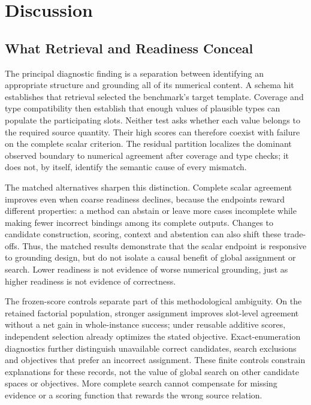 \documentclass[pdflatex,sn-basic,Numbered]{sn-jnl}
\begin{document}
\section{Discussion}
\label{sec:discussion}
\subsection{What Retrieval and Readiness Conceal}
The principal diagnostic finding is a separation between identifying an appropriate structure and grounding all of its numerical content. A schema hit establishes that retrieval selected the benchmark's target template. Coverage and type compatibility then establish that enough values of plausible types can populate the participating slots. Neither test asks whether each value belongs to the required source quantity. Their high scores can therefore coexist with failure on the complete scalar criterion. The residual partition localizes the dominant observed boundary to numerical agreement after coverage and type checks; it does not, by itself, identify the semantic cause of every mismatch.

The matched alternatives sharpen this distinction. Complete scalar agreement improves even when coarse readiness declines, because the endpoints reward different properties: a method can abstain or leave more cases incomplete while making fewer incorrect bindings among its complete outputs. Changes to candidate construction, scoring, context and abstention can also shift these trade-offs. Thus, the matched results demonstrate that the scalar endpoint is responsive to grounding design, but do not isolate a causal benefit of global assignment or search. Lower readiness is not evidence of worse numerical grounding, just as higher readiness is not evidence of correctness.

The frozen-score controls separate part of this methodological ambiguity. On the retained factorial population, stronger assignment improves slot-level agreement without a net gain in whole-instance success; under reusable additive scores, independent selection already optimizes the stated objective. Exact-enumeration diagnostics further distinguish unavailable correct candidates, search exclusions and objectives that prefer an incorrect assignment. These finite controls constrain explanations for these records, not the value of global search on other candidate spaces or objectives. More complete search cannot compensate for missing evidence or a scoring function that rewards the wrong source relation.
\end{document}
